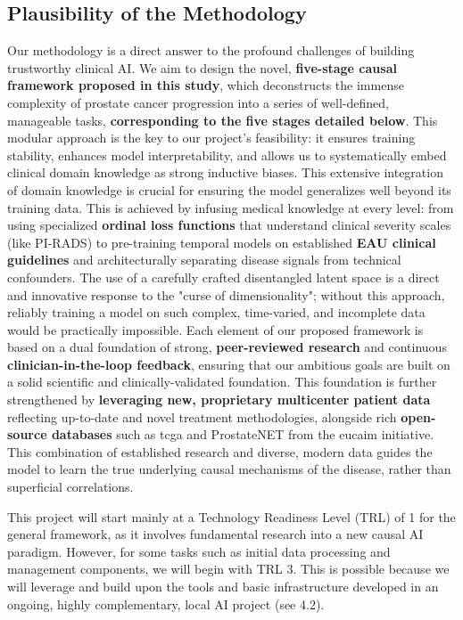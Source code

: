 \documentclass[11pt, a4paper]{article}
\begin{document}
\subsection{Plausibility of the Methodology}
Our methodology is a direct answer to the profound challenges of building trustworthy clinical AI. We aim to design the novel, \textbf{five-stage causal framework proposed in this study}, which deconstructs the immense complexity of prostate cancer progression into a series of well-defined, manageable tasks, \textbf{corresponding to the five stages detailed below}. This modular approach is the key to our project's feasibility: it ensures training stability, enhances model interpretability, and allows us to systematically embed clinical domain knowledge as strong inductive biases. This extensive integration of domain knowledge is crucial for ensuring the model generalizes well beyond its training data. This is achieved by infusing medical knowledge at every level: from using specialized \textbf{ordinal loss functions} that understand clinical severity scales (like PI-RADS) to pre-training temporal models on established \textbf{EAU clinical guidelines} and architecturally separating disease signals from technical confounders. The use of a carefully crafted disentangled latent space is a direct and innovative response to the "curse of dimensionality"; without this approach, reliably training a model on such complex, time-varied, and incomplete data would be practically impossible. Each element of our proposed framework is based on a dual foundation of strong, \textbf{peer-reviewed research} and continuous \textbf{clinician-in-the-loop feedback}, ensuring that our ambitious goals are built on a solid scientific and clinically-validated foundation. This foundation is further strengthened by \textbf{leveraging new, proprietary multicenter patient data} reflecting up-to-date and novel treatment methodologies, alongside rich \textbf{open-source databases} such as \gls{tcga} and ProstateNET from the \gls{eucaim} initiative. This combination of established research and diverse, modern data guides the model to learn the true underlying causal mechanisms of the disease, rather than superficial correlations.



This project will start mainly at a Technology Readiness Level (TRL) of 1 for the general framework, as it involves fundamental research into a new causal AI paradigm. However, for some tasks such as initial data processing and management components, we will begin with TRL 3. This is possible because we will leverage and build upon the tools and basic infrastructure developed in an ongoing, highly complementary, local AI project (see 4.2).
\end{document}
